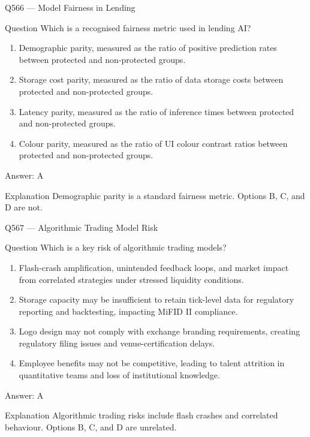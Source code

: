 \documentclass[aspectratio=169,8pt]{beamer}
\begin{document}
	\begin{frame}{Q566 --- Model Fairness in Lending}
		\begin{block}{Question}
			Which is a recognised fairness metric used in lending AI?
			\begin{enumerate}
				\item Demographic parity, measured as the ratio of positive prediction rates between protected and non-protected groups.
				\item Storage cost parity, measured as the ratio of data storage costs between protected and non-protected groups.
				\item Latency parity, measured as the ratio of inference times between protected and non-protected groups.
				\item Colour parity, measured as the ratio of UI colour contrast ratios between protected and non-protected groups.
			\end{enumerate}
		\end{block}
		\begin{exampleblock}{Answer: A}\end{exampleblock}
		\begin{block}{Explanation}
			Demographic parity is a standard fairness metric. Options B, C, and D are not.
		\end{block}
	\end{frame}
	
	\begin{frame}{Q567 --- Algorithmic Trading Model Risk}
		\begin{block}{Question}
			Which is a key risk of algorithmic trading models?
			\begin{enumerate}
				\item Flash-crash amplification, unintended feedback loops, and market impact from correlated strategies under stressed liquidity conditions.
				\item Storage capacity may be insufficient to retain tick-level data for regulatory reporting and backtesting, impacting MiFID II compliance.
				\item Logo design may not comply with exchange branding requirements, creating regulatory filing issues and venue-certification delays.
				\item Employee benefits may not be competitive, leading to talent attrition in quantitative teams and loss of institutional knowledge.
			\end{enumerate}
		\end{block}
		\begin{exampleblock}{Answer: A}\end{exampleblock}
		\begin{block}{Explanation}
			Algorithmic trading risks include flash crashes and correlated behaviour. Options B, C, and D are unrelated.
		\end{block}
	\end{frame}
	
\end{document}
